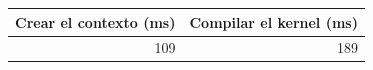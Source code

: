 \begin{tabular}{rr}
\toprule
Crear el contexto (ms) & Compilar el kernel (ms) \\
\midrule
109 & 189 \\
\bottomrule
\end{tabular}
